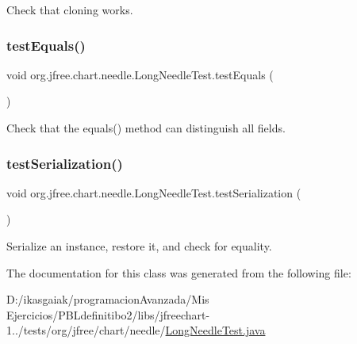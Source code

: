 Check that cloning works. \mbox{\label{classorg_1_1jfree_1_1chart_1_1needle_1_1_long_needle_test_a447138391b410d5f3544ec7aea1092a1}} 
\subsubsection{\texorpdfstring{test\+Equals()}{testEquals()}}
{\footnotesize\ttfamily void org.\+jfree.\+chart.\+needle.\+Long\+Needle\+Test.\+test\+Equals (\begin{DoxyParamCaption}{ }\end{DoxyParamCaption})}

Check that the equals() method can distinguish all fields. \mbox{\label{classorg_1_1jfree_1_1chart_1_1needle_1_1_long_needle_test_ac9097cc5713c052dbbfbdc7c33419f9c}} 
\subsubsection{\texorpdfstring{test\+Serialization()}{testSerialization()}}
{\footnotesize\ttfamily void org.\+jfree.\+chart.\+needle.\+Long\+Needle\+Test.\+test\+Serialization (\begin{DoxyParamCaption}{ }\end{DoxyParamCaption})}

Serialize an instance, restore it, and check for equality. 

The documentation for this class was generated from the following file\+:\begin{DoxyCompactItemize}
\item 
D\+:/ikasgaiak/programacion\+Avanzada/\+Mis Ejercicios/\+P\+B\+Ldefinitibo2/libs/jfreechart-\/1../tests/org/jfree/chart/needle/\mbox{\hyperlink{_long_needle_test_8java}{Long\+Needle\+Test.\+java}}\end{DoxyCompactItemize}
